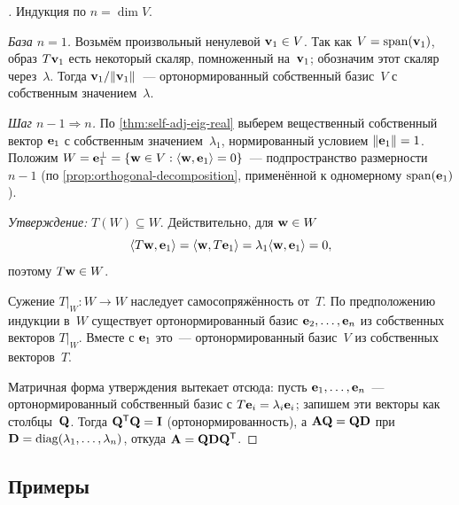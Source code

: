 \begin{proof}[]
Индукция по $n = \dim V$.

\emph{База $n = 1$.} Возьмём произвольный ненулевой
$\mathbf{v}_1 \in V$. Так как $V = \operatorname{span}(\mathbf{v}_1)$, образ $T\mathbf{v}_1$
есть некоторый скаляр, помноженный на~$\mathbf{v}_1$; обозначим этот
скаляр через~$\lambda$. Тогда $\mathbf{v}_1 / \|\mathbf{v}_1\|$~---
ортонормированный собственный базис~$V$ с собственным значением~$\lambda$.

\emph{Шаг $n - 1 \Rightarrow n$.} По \cref{thm:self-adj-eig-real}
выберем вещественный собственный вектор $\mathbf{e}_1$ с собственным
значением~$\lambda_1$, нормированный условием $\|\mathbf{e}_1\| = 1$.
Положим
$W = \mathbf{e}_1^{\perp} = \{\mathbf{w} \in V : \langle \mathbf{w}, \mathbf{e}_1 \rangle = 0\}$~---
подпространство размерности $n - 1$ (по
\cref{prop:orthogonal-decomposition}, применённой к одномерному
$\operatorname{span}(\mathbf{e}_1)$).

\emph{Утверждение:} $T(W) \subseteq W$. Действительно, для
$\mathbf{w} \in W$
\[
  \langle T\mathbf{w}, \mathbf{e}_1 \rangle
  = \langle \mathbf{w}, T\mathbf{e}_1 \rangle
  = \lambda_1 \langle \mathbf{w}, \mathbf{e}_1 \rangle = 0,
\]
поэтому $T\mathbf{w} \in W$.

Сужение $T|_W \colon W \to W$ наследует самосопряжённость от~$T$. По
предположению индукции в~$W$ существует ортонормированный базис
$\mathbf{e}_2, \dots, \mathbf{e}_n$ из собственных векторов $T|_W$. Вместе
с $\mathbf{e}_1$ это~--- ортонормированный базис~$V$ из собственных
векторов~$T$.

Матричная форма утверждения вытекает отсюда: пусть
$\mathbf{e}_1, \dots, \mathbf{e}_n$~--- ортонормированный собственный базис
с $T\mathbf{e}_i = \lambda_i \mathbf{e}_i$; запишем эти векторы как
столбцы~$\mathbf{Q}$. Тогда $\mathbf{Q}^{\mathsf{T}} \mathbf{Q} = \mathbf{I}$
(ортонормированность), а $\mathbf{A}\mathbf{Q} = \mathbf{Q}\mathbf{D}$ при
$\mathbf{D} = \operatorname{diag}(\lambda_1, \dots, \lambda_n)$, откуда
$\mathbf{A} = \mathbf{Q}\mathbf{D}\mathbf{Q}^{\mathsf{T}}$.
\end{proof}

\subsection*{Примеры}

